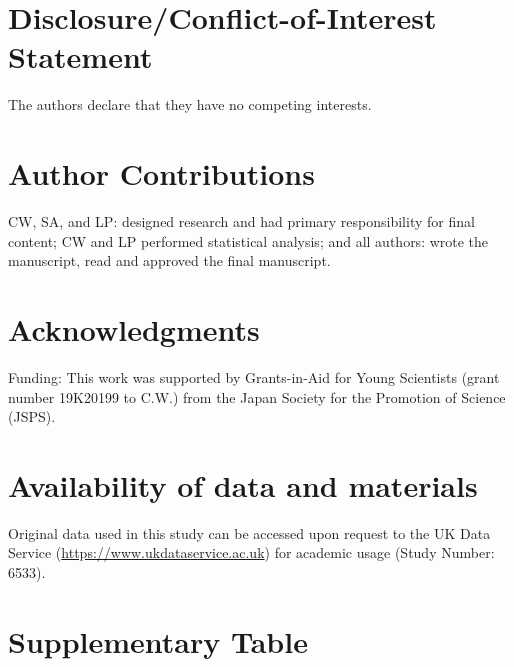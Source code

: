 \documentclass[utf8]{frontiersSCNS}
\begin{document}
\hypertarget{disclosureconflict-of-interest-statement}{%
\section*{Disclosure/Conflict-of-Interest
Statement}\label{disclosureconflict-of-interest-statement}}

The authors declare that they have no competing interests.

\hypertarget{author-contributions}{%
\section*{Author Contributions}\label{author-contributions}}

CW, SA, and LP: designed research and had primary responsibility for
final content; CW and LP performed statistical analysis; and all
authors: wrote the manuscript, read and approved the final manuscript.

\hypertarget{acknowledgments}{%
\section*{Acknowledgments}\label{acknowledgments}}

Funding: This work was supported by Grants-in-Aid for Young Scientists
(grant number 19K20199 to C.W.) from the Japan Society for the Promotion
of Science (JSPS).

\hypertarget{availability-of-data-and-materials}{%
\section*{Availability of data and
materials}\label{availability-of-data-and-materials}}

Original data used in this study can be accessed upon request to the UK
Data Service (\url{https://www.ukdataservice.ac.uk}) for academic usage
(Study Number: 6533).

\hypertarget{supplementary-table}{%
\section*{Supplementary Table}\label{supplementary-table}}
\end{document}
